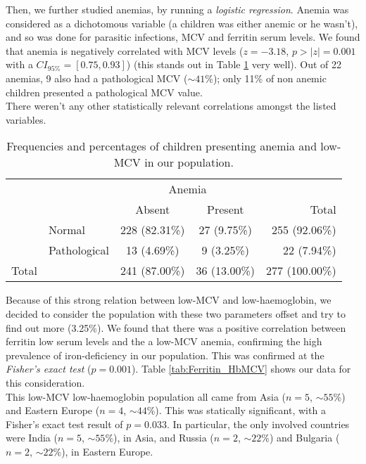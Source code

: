 Then, we further studied anemias, by running a \textit{logistic regression}. Anemia was considered as a dichotomous variable (a children was either anemic or he wasn't), and so was done for parasitic infections, MCV and ferritin serum levels. We found that anemia is negatively correlated with MCV levels ($z=-3.18$, $p>|z|=0.001$ with a $CI_{95\%} =[0.75,0.93]$) (this stands out in Table \ref{tab:HbMCV} very well). Out of 22 anemias, 9 also had a pathological MCV ($\sim 41\%$); only 11\% of non anemic children presented a pathological MCV value.\\
There weren't any other statistically relevant correlations amongst the listed variables.

\begin{table}[H]
   \centering
   \begin{tabular}{c l c c | r}
   	  & & \multicolumn{2}{c}{Anemia} & \\
   	  \cline{3-4}
       & & Absent & Present & Total\\
      \hline
       \parbox[t]{2mm}{} & Normal & 228 (82.31\%) & 27 (9.75\%) & 255 (92.06\%)\\
       & Pathological & 13 (4.69\%) & 9 (3.25\%) & 22 (7.94\%)\\
      \hline
      Total & & 241 (87.00\%) & 36 (13.00\%) & 277 (100.00\%)\\
   \end{tabular}
   \caption{Frequencies and percentages of children presenting anemia and low-MCV in our population.}
    \label{tab:HbMCV}
\end{table}

Because of this strong relation between low-MCV and low-haemoglobin, we decided to consider the population with these two parameters offset and try to find out more (3.25\%). We found that there was a positive correlation between ferritin low serum levels and the a low-MCV anemia, confirming the high prevalence of iron-deficiency in our population. This was confirmed at the \textit{Fisher's exact test} ($p=0.001$). Table \ref{tab:Ferritin_HbMCV} shows our data for this consideration.\\
This low-MCV low-haemoglobin population all came from Asia ($n=5$, $\sim 55\%$) and Eastern Europe ($n=4$, $\sim 44\%$). This was statically significant, with a Fisher's exact test result of $p=0.033$. In particular, the only involved countries were India ($n=5$, $\sim 55\%$), in Asia, and Russia ($n=2$, $\sim 22\%$) and Bulgaria ($n=2$, $\sim 22\%$), in Eastern Europe.

